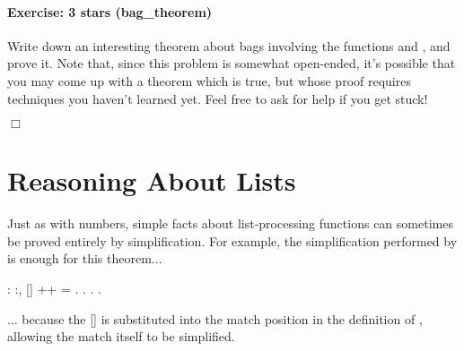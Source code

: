 \documentclass[12pt]{report}
\begin{document}
\paragraph{Exercise: 3 stars (bag\_theorem)}

 Write down an interesting theorem  about bags involving
    the functions  and , and prove it.  Note that, since this
    problem is somewhat open-ended, it's possible that you may come up
    with a theorem which is true, but whose proof requires techniques
    you haven't learned yet.  Feel free to ask for help if you get
    stuck! \begin{coqdoccode}
\coqdocemptyline
\end{coqdoccode}
\ensuremath{\Box} \begin{coqdoccode}
\coqdocemptyline
\end{coqdoccode}
\section{Reasoning About Lists}



 Just as with numbers, simple facts about list-processing
    functions can sometimes be proved entirely by simplification. For
    example, the simplification performed by  is enough
    for this theorem... \begin{coqdoccode}
\coqdocemptyline
\coqdocnoindent
{}  : \coqdockw{\ensuremath{\forall}} :,\coqdoceol
\coqdocindent{1.00em}
[] ++  = .\coqdoceol
\coqdocnoindent
{}. . .\coqdoceol
\coqdocemptyline
\end{coqdoccode}
... because the [] is substituted into the match position
    in the definition of , allowing the match itself to be
    simplified. 
\end{document}
